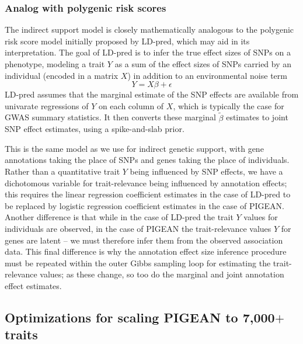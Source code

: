 \subsubsection{Analog with polygenic risk scores}
The indirect support model is closely mathematically analogous to the
polygenic risk score model initially proposed by
LD-pred\cite{analogous}, which may aid in its interpretation. The goal
of LD-pred is to infer the true effect sizes of SNPs on a phenotype,
modeling a trait $Y$ as a sum of the effect sizes of SNPs carried by
an individual (encoded in a matrix $X$) in addition to an environmental noise term
\[Y = X\beta + \epsilon\]
LD-pred assumes that the marginal estimate of the SNP effects are
available from univarate regressions of $Y$ on each column of $X$,
which is typically the case for GWAS summary statistics. It then
converts these marginal $\tilde{\beta}$ estimates to joint SNP effect
estimates, using a spike-and-slab prior.

This is the same model as we use for indirect genetic support, with
gene annotations taking the place of SNPs and genes taking the place
of individuals. Rather than a quantitative
trait $Y$ being influenced by SNP effects, we have a dichotomous
variable for trait-relevance being influenced by annotation effects;
this requires the linear regression coefficient estimates in the case
of LD-pred to be replaced by logistic regression coefficient estimates
in the case of PIGEAN. Another difference is that while in the case of
LD-pred the trait $Y$ values for individuals are observed, in the case
of PIGEAN the trait-relevance values $Y$ for genes are latent -- we
must therefore infer them from the observed association data. This
final difference is why the annotation effect size inference procedure
must be repeated within the outer Gibbs sampling loop for estimating
the trait-relevance values; as these change, so too do the marginal
and joint annotation effect estimates.

\subsection{Optimizations for scaling PIGEAN to 7,000$+$ traits}

